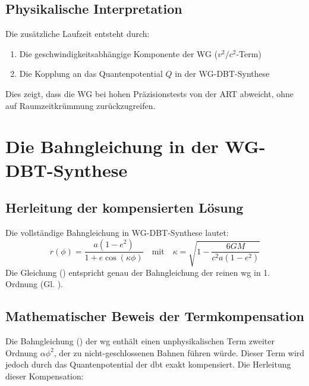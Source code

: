 \subsection{Physikalische Interpretation}
Die zusätzliche Laufzeit entsteht durch:
\begin{enumerate}
\item Die geschwindigkeitsabhängige Komponente der WG ($v^2/c^2$-Term)
\item Die Kopplung an das Quantenpotential $Q$ in der WG-DBT-Synthese
\end{enumerate}

Dies zeigt, dass die WG bei hohen Präzisionstests von der ART abweicht, ohne auf Raumzeitkrümmung zurückzugreifen.

\newpage
\section{Die Bahngleichung in der WG-DBT-Synthese}
\label{sec:bahn_alpha}

\subsection{Herleitung der kompensierten Lösung}
Die vollständige Bahngleichung in WG-DBT-Synthese lautet:
\begin{equation}
    \label{eq:r_wg_dbt}
    r(\phi) = \frac{a(1-e^2)}{1 + e\cos(\kappa\phi)} \quad \text{mit} \quad \kappa = \sqrt{1 - \frac{6GM}{c^2a(1-e^2)}}
\end{equation}
Die Gleichung () entspricht genau der Bahngleichung der reinen \gls{wg} in 1. Ordnung (Gl. ).

\subsection{Mathematischer Beweis der Termkompensation}
\label{sec:bahn_alpha_beweis}
Die Bahngleichung () der \gls{wg} enthält einen unphysikalischen Term zweiter Ordnung $\alpha\phi^2$, der zu nicht-geschlossenen Bahnen führen würde. Dieser Term wird
jedoch durch das Quantenpotential der \gls{dbt} exakt kompensiert. Die Herleitung dieser Kompensation:

